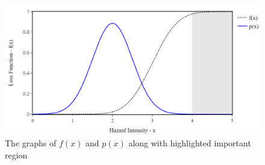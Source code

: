     \begin{figure}[H]
        \centering
        \includegraphics[scale=0.5]{Figures/Images/Illustrative Example/f&p}
        \caption{The graphs of $f(x)$ and $p(x)$ along with highlighted important region}
        \label{fig:f&p}
    \end{figure}